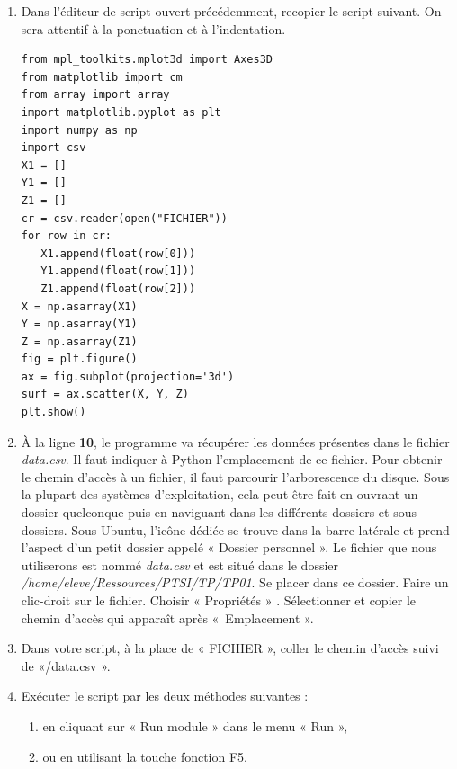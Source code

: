 \begin{exercice}

\begin{enumerate}
\item Dans l'éditeur de script ouvert précédemment, recopier le script suivant. On sera attentif \` a la ponctuation et \` a l'indentation.

\begin{verbatim}
from mpl_toolkits.mplot3d import Axes3D
from matplotlib import cm
from array import array   
import matplotlib.pyplot as plt   
import numpy as np   
import csv   
X1 = []   
Y1 = []   
Z1 = []   
cr = csv.reader(open("FICHIER"))   
for row in cr:   
   X1.append(float(row[0]))
   Y1.append(float(row[1]))  
   Z1.append(float(row[2]))
X = np.asarray(X1)   
Y = np.asarray(Y1)   
Z = np.asarray(Z1)   
fig = plt.figure()   
ax = fig.subplot(projection='3d')   
surf = ax.scatter(X, Y, Z)   
plt.show()
\end{verbatim}

\item À la ligne \textbf{10}, le programme va r\' ecup\' erer les donn\' ees pr\' esentes dans le fichier \textit{data.csv}. Il faut indiquer \` a Python l'emplacement de ce fichier. Pour obtenir le chemin d'acc\` es \` a un fichier, il faut parcourir l'arborescence du disque. Sous la plupart des syst\` emes d'exploitation, cela peut \^ etre fait en ouvrant un dossier quelconque puis en naviguant dans les diff\' erents dossiers et sous-dossiers. Sous Ubuntu, l'ic\^ one d\' edi\' ee se trouve dans la barre lat\' erale et prend l'aspect d'un petit dossier appel\' e « Dossier personnel ». Le fichier que nous utiliserons est nomm\' e \textit{data.csv} et est situ\' e dans le dossier \textit{/home/eleve/Ressources/PTSI/TP/TP01}. Se placer dans ce dossier. Faire un clic-droit sur le fichier. Choisir « Propri\' et\' es » . S\' electionner et copier le chemin d'acc\` es qui appara\^ it apr\` es «~Emplacement ».
\item Dans votre script, \` a la place de « FICHIER », coller le chemin d'acc\` es suivi de «/data.csv ».
\item Ex\' ecuter le script par les deux m\' ethodes suivantes :

\begin{enumerate}
\item en cliquant sur « Run module » dans le menu « Run », 
\item ou en utilisant la touche fonction F5.
\end{enumerate}
\end{enumerate}
\end{exercice}

